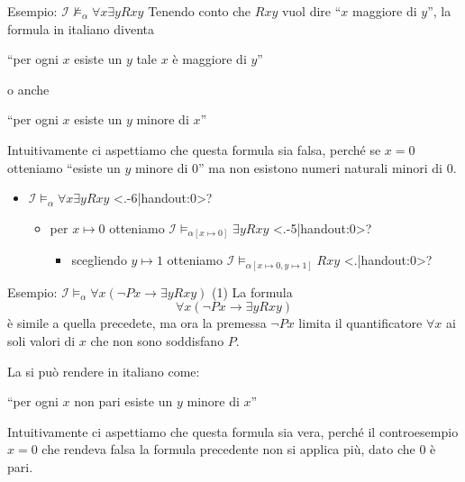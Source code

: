 \documentclass[aspectratio=169,10pt,dvipsnames,xcolor=table,handout]{beamer}
\newcommand{\mcI}{\mathcal{I}}
\begin{document}
\begin{frame}{Esempio: $\mcI \not\models_\alpha \forall x \exists y Rxy$}
    Tenendo conto che $Rxy$ vuol dire ``$x$ maggiore di $y$'', la formula in italiano diventa
    \begin{center}
        ``per ogni $x$ esiste un $y$ tale $x$ è maggiore di $y$''
    \end{center}
    o anche
    \begin{center}
        ``per ogni $x$ esiste un $y$ minore di $x$''
    \end{center}
    Intuitivamente ci aspettiamo che questa formula sia falsa, perché se $x=0$ otteniamo ``esiste un $y$ minore di 0'' ma non esistono numeri naturali minori di $0$.

    \pause
    \medskip
    \begin{itemize}[<+->]
        \item $\mcI \models_\alpha \forall x \exists y Rxy$ \only<.-6|handout:0>{?}
              \begin{itemize}
                  \item per $x \mapsto 0$ otteniamo $\mcI \models_{\alpha[x \mapsto 0]} \exists y Rxy$ \only<.-5|handout:0>{?}
                        \begin{itemize}
                            \item scegliendo $y \mapsto 1$ otteniamo $\mcI \models_{\alpha[x \mapsto 0, y \mapsto 1]} Rxy$ \only<.|handout:0>{?}
                        \end{itemize}
              \end{itemize}
    \end{itemize}
\end{frame}

\begin{frame}{Esempio: $\mcI \models_\alpha \forall x (\neg P x \to \exists y Rxy)$ (1) }
    La formula
    \[
        \forall x (\neg P x \to \exists y Rxy)
    \]
    è simile a quella precedete, ma ora la premessa $\neg Px$ limita il quantificatore $\forall x$ ai soli valori di $x$ che non sono soddisfano $P$.

    \medskip
    La si può rendere in italiano come:
    \begin{center}
        ``per ogni $x$ non pari esiste un $y$ minore di $x$''
    \end{center}

    Intuitivamente ci aspettiamo che questa formula sia vera, perché il controesempio $x=0$ che rendeva falsa la formula precedente non si applica più, dato che $0$ è pari.
\end{frame}
\end{document}
